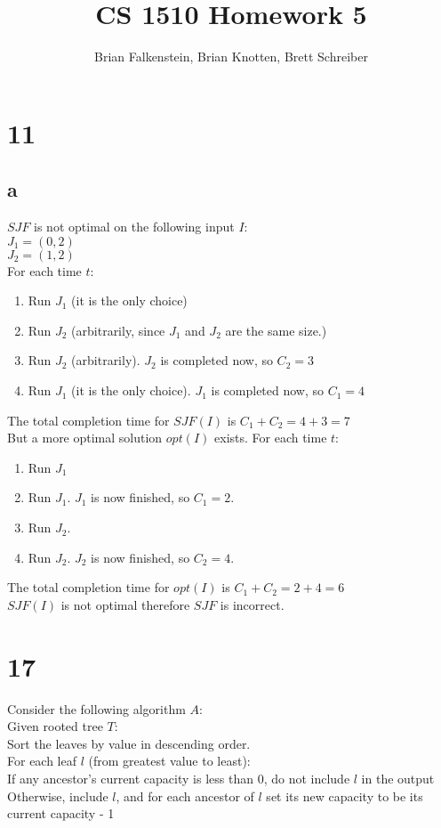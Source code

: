 \documentclass[letterpaper,notitlepage,twoside]{article}
\title{CS 1510 Homework 5}
\author{Brian Falkenstein, Brian Knotten, Brett Schreiber}
\newcommand\tab[1][1cm]{\hspace*{#1}} %
\begin{document}
\maketitle

\section*{11}
\subsection*{a}
$SJF$ is not optimal on the following input $I$:\\
$J_1 = (0, 2)$\\
$J_2 = (1, 2)$\\
For each time $t$:
\begin{enumerate}
\item Run $J_1$ (it is the only choice)
\item Run $J_2$ (arbitrarily, since $J_1$ and $J_2$ are the same size.)
\item Run $J_2$ (arbitrarily). $J_2$ is completed now, so $C_2 = 3$
\item Run $J_1$ (it is the only choice). $J_1$ is completed now, so $C_1 = 4$
\end{enumerate}
The total completion time for $SJF(I)$ is $C_1 + C_2 = 4 + 3 = 7$\\
But a more optimal solution $opt(I)$ exists. For each time $t$:
\begin{enumerate}
\item Run $J_1$
\item Run $J_1$. $J_1$ is now finished, so $C_1 = 2$.
\item Run $J_2$.
\item Run $J_2$. $J_2$ is now finished, so $C_2 = 4$.
\end{enumerate}
The total completion time for $opt(I)$ is $C_1 + C_2 = 2 + 4 = 6$\\
$SJF(I)$ is not optimal therefore $SJF$ is incorrect.

\section*{17}
Consider the following algorithm $A$:\\
Given rooted tree $T$:\\
\tab Sort the leaves by value in descending order.\\
\tab For each leaf $l$ (from greatest value to least): \\ 
\tab\tab If any ancestor's current capacity is less than 0, do not include $l$ in the output
\tab\tab Otherwise, include $l$, and for each ancestor of $l$ set its new capacity to be its current capacity - 1
\end{document}
